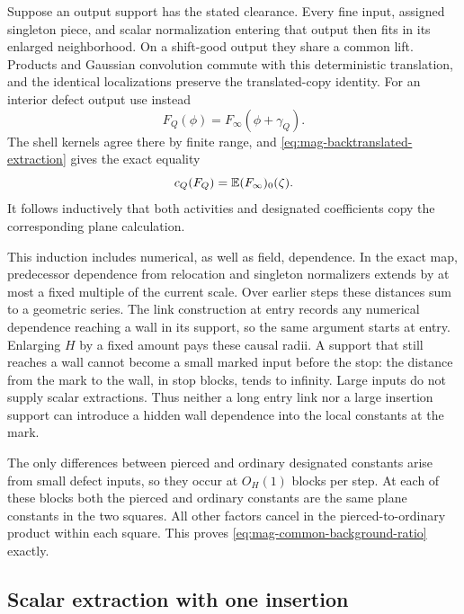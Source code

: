 Suppose an output support has the stated clearance.  Every fine
input, assigned singleton piece, and scalar normalization entering
that output then fits in its enlarged neighborhood.  On a
shift-good output they share a common lift.  Products and Gaussian
convolution commute with this deterministic translation, and the
identical localizations preserve the translated-copy identity.
For an interior defect output use instead
\begin{equation}\label{eq:mag-pierced-copy}
 F_Q(\phi)=F_\infty(\phi+\gamma_Q).
\end{equation}
The shell kernels agree there by finite range, and
\eqref{eq:mag-backtranslated-extraction} gives the exact equality
\[
 c_Q(F_Q)=\mathbb E(F_\infty)_0(\zeta).
\]
It follows inductively that both activities and designated
coefficients copy the corresponding plane calculation.

This induction includes numerical, as well as field, dependence.
In the exact map, predecessor dependence from relocation and
singleton normalizers extends by at most a fixed multiple of the
current scale.  Over earlier steps these distances sum to a
geometric series.  The link construction at entry records any
numerical dependence reaching a wall in its support, so the same
argument starts at entry.  Enlarging $H$ by a fixed amount pays
these causal radii.  A support that still reaches a wall cannot
become a small marked input before the stop: the distance from
the mark to the wall, in stop blocks, tends to infinity.  Large
inputs do not supply scalar extractions.  Thus neither a long
entry link nor a large insertion support can introduce a hidden
wall dependence into the local constants at the mark.

The only differences between pierced and ordinary designated
constants arise from small defect inputs, so they occur at
$O_H(1)$ blocks per step.  At each of these blocks both the
pierced and ordinary constants are the same plane constants in
the two squares.  All other factors cancel in the
pierced-to-ordinary product within each square.  This proves
\eqref{eq:mag-common-background-ratio} exactly.

\subsection{Scalar extraction with one insertion}

